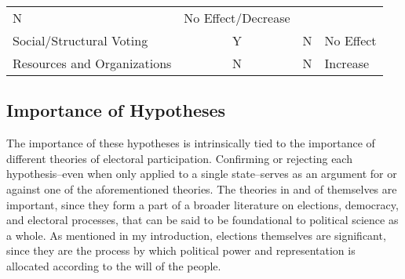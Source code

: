 \documentclass[12pt,twoside]{reedthesis}
\begin{document}
\begin{longtable}[]{@{}lccl@{}}
\begin{minipage}[t]{0.06\columnwidth}
  N\strut
  \end{minipage} & \begin{minipage}[t]{0.25\columnwidth}\raggedright\strut
  No Effect/Decrease\strut
  \end{minipage}\tabularnewline
  \begin{minipage}[t]{0.37\columnwidth}\raggedright\strut
  Social/Structural Voting\strut
  \end{minipage} & \begin{minipage}[t]{0.06\columnwidth}\centering\strut
  Y\strut
  \end{minipage} & \begin{minipage}[t]{0.06\columnwidth}\centering\strut
  N\strut
  \end{minipage} & \begin{minipage}[t]{0.25\columnwidth}\raggedright\strut
  No Effect\strut
  \end{minipage}\tabularnewline
  \begin{minipage}[t]{0.37\columnwidth}\raggedright\strut
  Resources and Organizations\strut
  \end{minipage} & \begin{minipage}[t]{0.06\columnwidth}\centering\strut
  N\strut
  \end{minipage} & \begin{minipage}[t]{0.06\columnwidth}\centering\strut
  N\strut
  \end{minipage} & \begin{minipage}[t]{0.25\columnwidth}\raggedright\strut
  Increase\strut
  \end{minipage}\tabularnewline
  \bottomrule
  \end{longtable}
  
  \subsection{Importance of Hypotheses}\label{importance-of-hypotheses}
  
  The importance of these hypotheses is intrinsically tied to the
  importance of different theories of electoral participation. Confirming
  or rejecting each hypothesis--even when only applied to a single
  state--serves as an argument for or against one of the aforementioned
  theories. The theories in and of themselves are important, since they
  form a part of a broader literature on elections, democracy, and
  electoral processes, that can be said to be foundational to political
  science as a whole. As mentioned in my introduction, elections
  themselves are significant, since they are the process by which
  political power and representation is allocated according to the will of
  the people.
  
\end{document}
